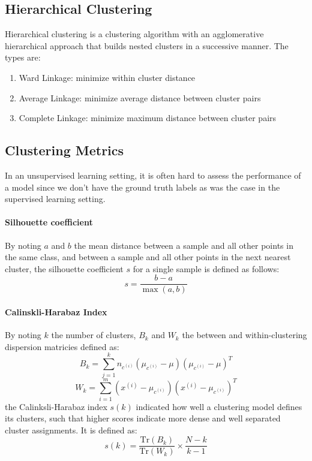 \documentclass[twoside,twocolumn]{article}
\begin{document}
\subsection{Hierarchical Clustering}
Hierarchical clustering is a clustering algorithm with an agglomerative
hierarchical approach that builds nested clusters in a successive manner. The
types are:
\begin{enumerate}
  \item Ward Linkage: minimize within cluster distance
  \item Average Linkage: minimize average distance between cluster pairs
  \item Complete Linkage: minimize maximum distance between cluster pairs
\end{enumerate}
\subsection{Clustering Metrics}
In an unsupervised learning setting, it is often hard to assess the
performance of a model since we don't have the ground truth labels as was
the case in the supervised learning setting.
\paragraph{Silhouette coefficient} By noting $a$ and $b$ the
mean distance between a sample and all other points in the same class,
and between a sample and all other points in the next nearest cluster,
the silhouette coefficient $s$ for a single sample is defined as follows:
\begin{equation}
  s = \frac{b - a}{\max(a, b)}
\end{equation}
\paragraph{Calinskli-Harabaz Index} By noting $k$ the number of clusters, $B_k$
and $W_k$ the between and within-clustering dispersion matricies defined as:
\begin{equation}
  B_k=\sum_{j=1}^kn_{c^{(i)}}(\mu_{c^{(i)}}-\mu)(\mu_{c^{(i)}}-\mu)^T
\end{equation}
\begin{equation}
  W_k=\sum_{i=1}^m(x^{(i)}-\mu_{c^{(i)}})(x^{(i)}-\mu_{c^{(i)}})^T
\end{equation}
the Calinksli-Harabaz index $s(k)$ indicated how well a clustering model
defines its clusters, such that higher scores indicate more dense and well
separated cluster assignments. It is defined as:
\begin{equation}
  s(k)=\frac{\textrm{Tr}(B_k)}{\textrm{Tr}(W_k)}\times\frac{N-k}{k-1}
\end{equation}
\end{document}
